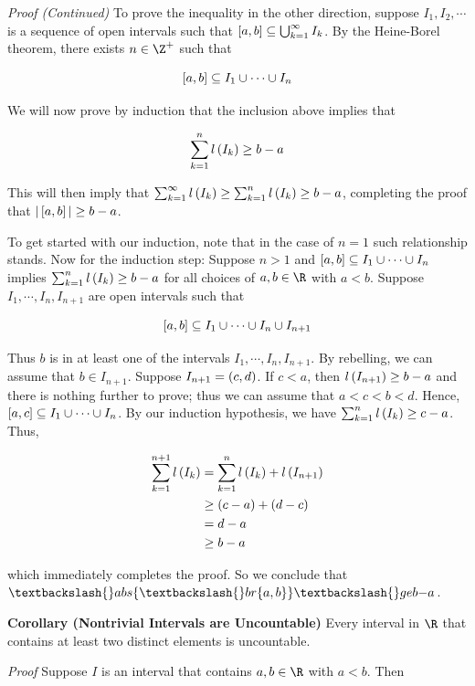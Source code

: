 \documentclass[
]{article}
\newenvironment{Shaded}{}{}
\newcommand{\NormalTok}[1]{#1}
\begin{document}
\emph{Proof (Continued)} To prove the inequality in the other direction,
suppose \(I_1,I_2,\cdots\) is a sequence of open intervals such that
\(\left[a,b\right]\subseteq \bigcup_{{k} = 1}^{\infty} I_k\). By the Heine-Borel theorem, there exists
\(n\in \Z^+\) such that

\[\left[a,b\right]\subseteq I_1\cup\cdots \cup I_n\]

We will now prove by induction that the inclusion above implies that

\[\sum_{k = 1}^nl\left(I_k\right)\ge b-a\]

This will then imply that
\(\sum_{{k} = 1}^{\infty} l\left(I_k\right)\ge \sum_{k = 1}^nl\left(I_k\right)\ge b-a\), completing the
proof that \(|\left[a,b\right]|\ge b-a\).

To get started with our induction, note that in the case of \(n = 1\)
such relationship stands. Now for the induction step: Suppose \(n>1\)
and \(\left[a,b\right]\subseteq I_1\cup\cdots \cup I_n\) implies
\(\sum_{k = 1}^nl\left(I_k\right)\ge b-a\) for all choices of \(a,b\in\R\) with
\(a<b\). Suppose \(I_1,\cdots,I_n,I_{n+1}\) are open intervals such that

\[\left[a,b\right]\subseteq I_1\cup\cdots \cup I_n\cup I_{n+1}\]

Thus \(b\) is in at least one of the intervals
\(I_1,\cdots,I_n,I_{n+1}\). By rebelling, we can assume that
\(b\in I_{n+1}\). Suppose \(I_{n+1} = \left(c,d\right)\). If \(c<a\), then
\(l\left(I_{n+1}\right)\ge b-a\) and there is nothing further to prove; thus we
can assume that \(a<c<b<d\). Hence,
\(\left[a,c\right]\subseteq I_1\cup\cdots \cup I_n\). By our induction hypothesis, we
have \(\sum_{k = 1}^n l\left(I_k\right)\ge c-a\). Thus,

\[\begin{aligned}
\sum_{k = 1}^{n+1}l\left(I_k\right) & = \sum_{k = 1}^nl\left(I_k\right)+l\left(I_{n+1}\right)\\
& \ge \left(c-a\right)+\left(d-c\right)\\
& = d-a \\
& \ge b-a
\end{aligned}\]

\begin{Shaded}
\begin{Highlighting}[]
\NormalTok{which immediately completes the proof. So we conclude that $\textbackslash{}abs\{\textbackslash{}br\{a,b\}\}\textbackslash{}ge b{-}a$.}
\end{Highlighting}
\end{Shaded}

\textbf{Corollary (Nontrivial Intervals are Uncountable)} Every interval
in \(\R\) that contains at least two distinct elements is uncountable.

\emph{Proof} Suppose \(I\) is an interval that contains \(a,b\in \R\)
with \(a<b\). Then
\end{document}
